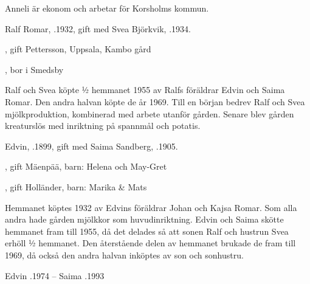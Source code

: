 Anneli är ekonom och arbetar för Korsholms kommun.





Ralf Romar, .1932, gift med Svea Björkvik, .1934.
\begin{jhchildren}
  \item {}, gift Pettersson, Uppsala, Kambo gård
  \item {}, bor i Smedsby
\end{jhchildren}
Ralf och Svea köpte  ½ hemmanet 1955 av Ralfs föräldrar Edvin och Saima Romar. Den andra halvan köpte de  år 1969. Till en början bedrev Ralf och Svea mjölkproduktion, kombinerad med arbete utanför gården. Senare blev gården kreaturslös med inriktning på spannmål och potatis.


Edvin, .1899, gift med Saima Sandberg, .1905.
\begin{jhchildren}
  \item {}, gift Mäenpää, barn: Helena och May-Gret
  \item {}
  \item {}, gift Holländer, barn: Marika \& Mats
\end{jhchildren}
Hemmanet köptes  1932  av Edvins föräldrar Johan och Kajsa Romar. Som alla andra hade gården mjölkkor som huvudinriktning. Edvin och Saima skötte hemmanet fram till 1955, då det delades så att sonen Ralf och hustrun Svea erhöll ½ hemmanet.  Den återstående delen av hemmanet brukade de fram till 1969, då också den andra halvan inköptes av son och sonhustru.

Edvin .1974  --  Saima .1993


